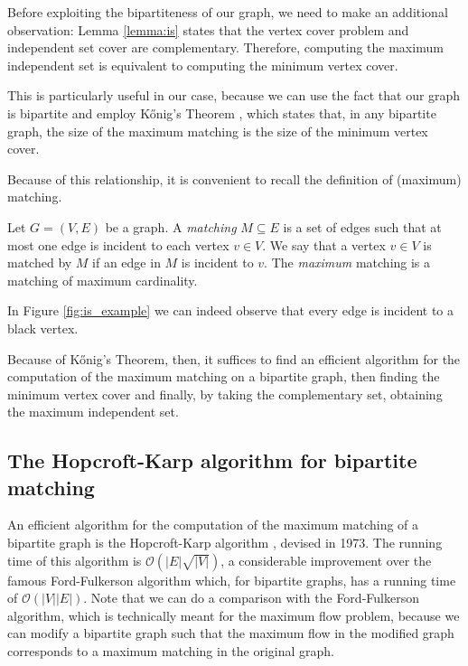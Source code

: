 Before exploiting the bipartiteness of our graph, we need to make an additional observation: Lemma \ref{lemma:is} states that the vertex cover problem and independent set cover are complementary. Therefore, computing the maximum independent set is equivalent to computing the minimum vertex cover.

This is particularly useful in our case, because we can use the fact that our graph is bipartite and employ K\H{o}nig's Theorem \cite{konig}, which states that, in any bipartite graph, the size of the maximum matching is the size of the minimum vertex cover. 

Because of this relationship, it is convenient to recall the definition of (maximum) matching.

\begin{definition}[Matching]
	Let $G=(V,E)$ be a graph. A \emph{matching} $M \subseteq E$ is a set of edges such that at most one edge is incident to each vertex $v \in V$. We say that a vertex $v \in V$ is matched by $M$ if an edge in $M$ is incident to $v$. The \emph{maximum} matching is a matching of maximum cardinality.
\end{definition}

In Figure \ref{fig:is_example} we can indeed observe that every edge is incident to a black vertex.

Because of K\H{o}nig's Theorem, then, it suffices to find an efficient algorithm for the computation of the maximum matching on a bipartite graph, then finding the minimum vertex cover and finally, by taking the complementary set, obtaining the maximum independent set.

\subsection{The Hopcroft-Karp algorithm for bipartite matching}

An efficient algorithm for the computation of the maximum matching of a bipartite graph is the Hopcroft-Karp algorithm \cite{hopcroft_karp}, devised in 1973. The running time of this algorithm is $\mathcal{O}\left( |E|\sqrt{|V|} \right)$, a considerable improvement over the famous Ford-Fulkerson algorithm which, for bipartite graphs, has a running time of $\mathcal{O}\left( |V||E| \right)$. Note that we can do a comparison with the Ford-Fulkerson algorithm, which is technically meant for the maximum flow problem, because we can modify a bipartite graph such that the maximum flow in the modified graph corresponds to a maximum matching in the original graph. 

